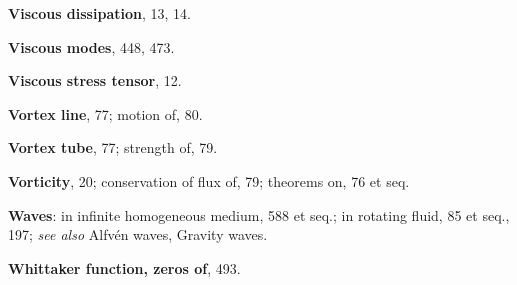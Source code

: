 \begin{small}
\medskip\noindent
\textbf{Viscous dissipation}, 13, 14.

\medskip\noindent
\textbf{Viscous modes}, 448, 473.

\medskip\noindent
\textbf{Viscous stress tensor}, 12.

\medskip\noindent
\textbf{Vortex line}, 77;
  motion of, 80.

\medskip\noindent
\textbf{Vortex tube}, 77;
  strength of, 79.

\medskip\noindent
\textbf{Vorticity}, 20;
  conservation of flux of, 79;
  theorems on, 76 et seq.

\bigskip\noindent
\textbf{Waves}:
  in infinite homogeneous medium, 588 et
    seq.;
  in rotating fluid, 85 et seq., 197;
  \textit{see also} Alfv\'en waves, Gravity waves.

\medskip\noindent
\textbf{Whittaker function, zeros of}, 493.
\end{small}
